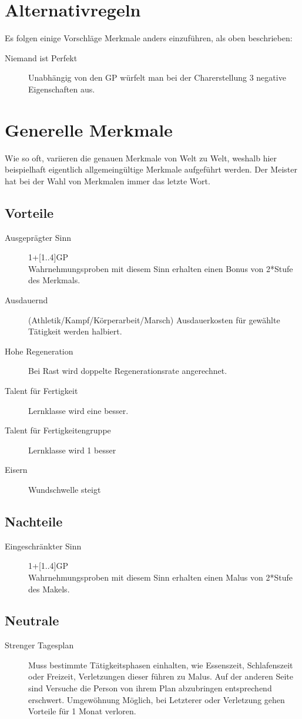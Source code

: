 \documentclass[a4paper,12pt,oneside]{book}
\begin{document}
\section{Alternativregeln}
Es folgen einige Vorschläge Merkmale anders einzuführen, als oben beschrieben:
\begin{description}
\item[Niemand ist Perfekt]Unabhängig von den GP würfelt man bei der Charerstellung 3 negative Eigenschaften aus.
\end{description}
\section{Generelle Merkmale}
Wie so oft, variieren die genauen Merkmale von Welt zu Welt, weshalb hier beispielhaft eigentlich allgemeingültige Merkmale aufgeführt werden. Der Meister hat bei der Wahl von Merkmalen immer das letzte Wort.
\subsection{Vorteile}
\begin{description}
\item[Ausgeprägter Sinn]1+[1..4]GP
\\Wahrnehmungsproben mit diesem Sinn erhalten einen Bonus von 2*Stufe des Merkmals.
\item[Ausdauernd] (Athletik/Kampf/Körperarbeit/Marsch) Ausdauerkosten für gewählte Tätigkeit werden halbiert.
\item[Hohe Regeneration] Bei Rast wird doppelte Regenerationsrate angerechnet.
\item[Talent für Fertigkeit] Lernklasse wird eine besser.
\item[Talent für Fertigkeitengruppe] Lernklasse wird 1 besser
\item[Eisern] Wundschwelle steigt
\end{description}

\subsection{Nachteile}
\begin{description}
\item[Eingeschränkter Sinn]1+[1..4]GP
\\Wahrnehmungsproben mit diesem Sinn erhalten einen Malus von 2*Stufe des Makels.
\end{description}

\subsection{Neutrale}
\begin{description}
\item[Strenger Tagesplan] Muss bestimmte Tätigkeitsphasen einhalten, wie Essenszeit, Schlafenszeit oder Freizeit, Verletzungen dieser führen zu Malus. Auf der anderen Seite sind Versuche die Person von ihrem Plan abzubringen entsprechend erschwert. Umgewöhnung Möglich, bei Letzterer oder Verletzung gehen Vorteile für 1 Monat verloren.
\end{description}    
\end{document}
